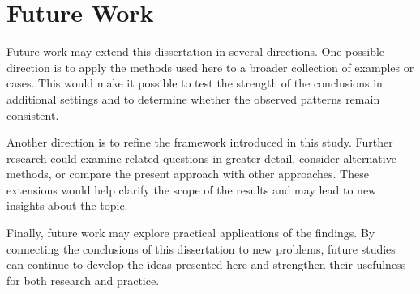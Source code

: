 \section{Future Work}
\label{sec:future}

Future work may extend this dissertation in several directions. One possible direction is to apply the methods used here to a broader collection of examples or cases. This would make it possible to test the strength of the conclusions in additional settings and to determine whether the observed patterns remain consistent.

Another direction is to refine the framework introduced in this study. Further research could examine related questions in greater detail, consider alternative methods, or compare the present approach with other approaches. These extensions would help clarify the scope of the results and may lead to new insights about the topic.

Finally, future work may explore practical applications of the findings. By connecting the conclusions of this dissertation to new problems, future studies can continue to develop the ideas presented here and strengthen their usefulness for both research and practice.